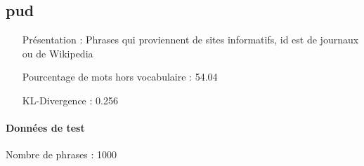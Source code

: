 


\subsection{pud } 
 \begin{itemize} 
 \item[Présentation :] Phrases qui proviennent de sites informatifs, id est de journaux ou de Wikipedia

 \item[Pourcentage de mots hors vocabulaire : ]54.04
 \item[KL-Divergence :]0.256
 \end{itemize}  \paragraph{Données de test \\ }  
 Nombre de phrases : 1000\\ 
